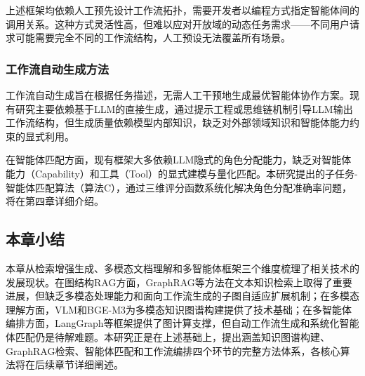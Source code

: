 上述框架均依赖人工预先设计工作流拓扑，需要开发者以编程方式指定智能体间的调用关系。这种方式灵活性高，但难以应对开放域的动态任务需求——不同用户请求可能需要完全不同的工作流结构，人工预设无法覆盖所有场景。

\subsubsection{工作流自动生成方法}

工作流自动生成旨在根据任务描述，无需人工干预地生成最优智能体协作方案。现有研究主要依赖基于LLM的直接生成，通过提示工程或思维链机制引导LLM输出工作流结构\cite{wei2022chain}，但生成质量依赖模型内部知识，缺乏对外部领域知识和智能体能力约束的显式利用。

在智能体匹配方面，现有框架大多依赖LLM隐式的角色分配能力，缺乏对智能体能力（Capability）和工具（Tool）的显式建模与量化匹配。本研究提出的子任务-智能体匹配算法（算法C），通过三维评分函数系统化解决角色分配准确率问题，将在第四章详细介绍。

\subsection{本章小结}

本章从检索增强生成、多模态文档理解和多智能体框架三个维度梳理了相关技术的发展现状。在图结构RAG方面，GraphRAG等方法在文本知识检索上取得了重要进展，但缺乏多模态处理能力和面向工作流生成的子图自适应扩展机制；在多模态理解方面，VLM和BGE-M3为多模态知识图谱构建提供了技术基础；在多智能体编排方面，LangGraph等框架提供了图计算支撑，但自动工作流生成和系统化智能体匹配仍是待解难题。本研究正是在上述基础上，提出涵盖知识图谱构建、GraphRAG检索、智能体匹配和工作流编排四个环节的完整方法体系，各核心算法将在后续章节详细阐述。
